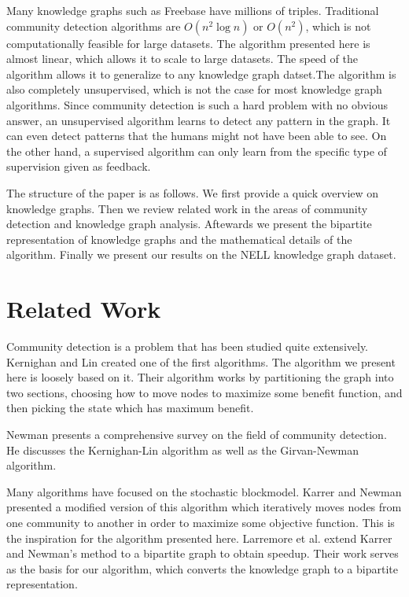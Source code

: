 \documentclass[12pt]{article}
\begin{document}
Many knowledge graphs such as Freebase\cite{Freebase} have millions of triples.
Traditional community detection algorithms are $O(n^2 \log n)$ or $O(n^2)$,
which is not computationally feasible for large datasets. The algorithm
presented here is almost linear, which allows it to scale to large datasets. The
speed of the algorithm allows it to generalize to any knowledge graph datset.The
algorithm is also completely unsupervised, which is not the case for most
knowledge graph
algorithms\cite{Nickel2011}\cite{Bordes2013}\cite{Gao2015}\cite{Chang2014}.
Since community detection is such a hard problem with no obvious answer, an
unsupervised algorithm learns to detect any pattern in the graph. It can even
detect patterns that the humans might not have been able to see. On the other
hand, a supervised algorithm can only learn from the specific type of
supervision given as feedback.

The structure of the paper is as follows. We first provide a quick overview on
knowledge graphs. Then we review related work in the areas of community
detection and knowledge graph analysis. Aftewards we present the bipartite
representation of knowledge graphs and the mathematical details of the
algorithm. Finally we present our results on the NELL\cite{Carlson2010}
knowledge graph dataset.

\section{Related Work}
\label{Related Work}

Community detection is a problem that has been studied quite extensively.
Kernighan and Lin\cite{Kernighan1970} created one of the first algorithms.
The algorithm we present here is loosely based on it. Their algorithm works by
partitioning the graph into two sections, choosing how to move nodes to maximize
some benefit function, and then picking the state which has maximum benefit.

Newman\cite{Newman2004} presents a comprehensive survey on the field of
community detection. He discusses the Kernighan-Lin algorithm as well as the
Girvan-Newman algorithm\cite{Girvan2002}.

Many algorithms have focused on the stochastic blockmodel\cite{Holland1983}.
Karrer and Newman\cite{Karrer2011} presented a modified version of this algorithm
which iteratively moves nodes from one community to another in order to maximize
some objective function. This is the inspiration for the algorithm presented here.
Larremore et al.\cite{Larremore2014} extend Karrer and Newman's method to a bipartite
graph to obtain speedup. Their work serves as the basis for our algorithm, which
converts the knowledge graph to a bipartite representation.
\end{document}
